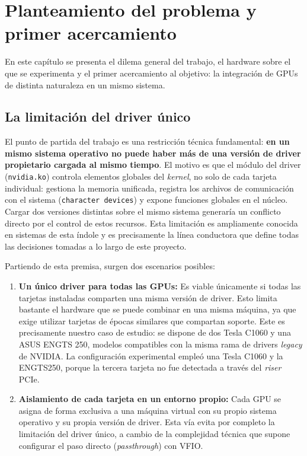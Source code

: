 \chapter{Planteamiento del problema y primer acercamiento} \label{cap1}

En este capítulo se presenta el dilema general del trabajo, el hardware sobre el que se
experimenta y el primer acercamiento al objetivo: la integración de GPUs de distinta naturaleza
en un mismo sistema.

\section{La limitación del driver único}

El punto de partida del trabajo es una restricción técnica fundamental: \textbf{en un mismo 
sistema operativo no puede haber más de una versión de driver propietario cargada al mismo tiempo}. 
El motivo es que el módulo del driver (\texttt{nvidia.ko}) controla elementos globales del 
\textit{kernel}, no solo de cada tarjeta individual: gestiona la memoria unificada, registra 
los archivos de comunicación con el sistema (\texttt{character devices}) y expone funciones globales 
en el núcleo. Cargar dos versiones distintas sobre el mismo sistema generaría un conflicto directo 
por el control de estos recursos. Esta limitación es ampliamente conocida en sistemas de esta índole
y es precisamente la línea conductora que define todas las decisiones tomadas a lo largo de este proyecto.

Partiendo de esta premisa, surgen dos escenarios posibles:
\begin{enumerate}
    \item \textbf{Un único driver para todas las GPUs:} Es viable únicamente si todas las tarjetas 
    instaladas comparten una misma versión de driver. Esto limita bastante el hardware 
    que se puede combinar en una misma máquina, ya que exige utilizar tarjetas de épocas similares que compartan 
    soporte. 
    Este es precisamente nuestro caso de estudio: se dispone de dos Tesla C1060 y una ASUS ENGTS 250, modelos compatibles con la misma rama de drivers \textit{legacy} de NVIDIA. La configuración experimental empleó una Tesla C1060 y la ENGTS250, porque la tercera tarjeta no fue detectada a través del \textit{riser} PCIe.
    \item \textbf{Aislamiento de cada tarjeta en un entorno propio:} Cada GPU se asigna de forma 
    exclusiva a una máquina virtual con su propio sistema operativo y su propia versión de driver. 
    Esta vía evita por completo la limitación del driver único, a cambio de la complejidad técnica 
    que supone configurar el paso directo (\textit{passthrough}) con VFIO.
\end{enumerate}

